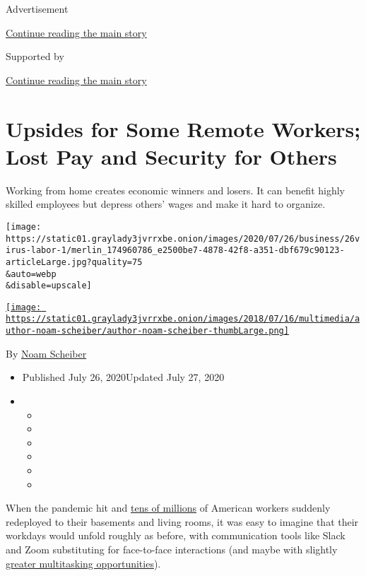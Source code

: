 Advertisement

\protect\hyperlink{after-top}{Continue reading the main story}

Supported by

\protect\hyperlink{after-sponsor}{Continue reading the main story}

\hypertarget{upsides-for-some-remote-workers-lost-pay-and-security-for-others}{%
\section{Upsides for Some Remote Workers; Lost Pay and Security for
Others}\label{upsides-for-some-remote-workers-lost-pay-and-security-for-others}}

Working from home creates economic winners and losers. It can benefit
highly skilled employees but depress others' wages and make it hard to
organize.

\texttt{[image: https://static01.graylady3jvrrxbe.onion/images/2020/07/26/business/26virus-labor-1/merlin\_174960786\_e2500be7-4878-42f8-a351-dbf679c90123-articleLarge.jpg?quality=75\\\&auto=webp\\\&disable=upscale]}

\href{https://www.nytimes3xbfgragh.onion/by/noam-scheiber}{\texttt{[image: https://static01.graylady3jvrrxbe.onion/images/2018/07/16/multimedia/author-noam-scheiber/author-noam-scheiber-thumbLarge.png]}}

By \href{https://www.nytimes3xbfgragh.onion/by/noam-scheiber}{Noam
Scheiber}

\begin{itemize}
\item
  Published July 26, 2020Updated July 27, 2020
\item
  \begin{itemize}
  \item
  \item
  \item
  \item
  \item
  \item
  \end{itemize}
\end{itemize}

When the pandemic hit and \href{https://www.nber.org/papers/w27344}{tens
of millions} of American workers suddenly redeployed to their basements
and living rooms, it was easy to imagine that their workdays would
unfold roughly as before, with communication tools like Slack and Zoom
substituting for face-to-face interactions (and maybe with slightly
\href{https://slate.com/news-and-politics/2020/05/toilet-flush-supreme-court-livestream.html}{greater
multitasking opportunities}).

